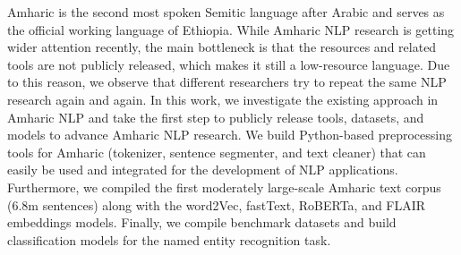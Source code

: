 Amharic is the second most spoken Semitic language after Arabic and serves as the official working language of Ethiopia. While Amharic NLP research is getting wider attention recently, the main bottleneck is that the resources and related tools are not publicly released, which makes it still a low-resource language. Due to this reason, we observe that different researchers try to repeat the same NLP research again and again. In this work, we investigate the existing approach in Amharic NLP and take the first step to publicly release tools, datasets, and models to advance Amharic NLP research. We build Python-based preprocessing tools for Amharic (tokenizer, sentence segmenter, and text cleaner) that can easily be used and integrated for the development of NLP applications. Furthermore, we compiled the first moderately large-scale Amharic text corpus (6.8m sentences) along with the word2Vec, fastText, RoBERTa, and FLAIR embeddings models. Finally, we compile benchmark datasets and build classification models for the named entity recognition task.
